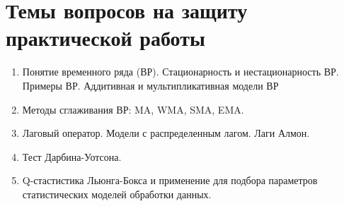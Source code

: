 \documentclass[
]{article}
\providecommand{\tightlist}{%
  \setlength{\itemsep}{0pt}\setlength{\parskip}{0pt}}
\begin{document}
\hypertarget{ux442ux435ux43cux44b-ux432ux43eux43fux440ux43eux441ux43eux432-ux43dux430-ux437ux430ux449ux438ux442ux443-ux43fux440ux430ux43aux442ux438ux447ux435ux441ux43aux43eux439-ux440ux430ux431ux43eux442ux44b}{%
\section{\texorpdfstring{\textbf{Темы вопросов на защиту практической
работы}}{Темы вопросов на защиту практической работы}}\label{ux442ux435ux43cux44b-ux432ux43eux43fux440ux43eux441ux43eux432-ux43dux430-ux437ux430ux449ux438ux442ux443-ux43fux440ux430ux43aux442ux438ux447ux435ux441ux43aux43eux439-ux440ux430ux431ux43eux442ux44b}}

\begin{enumerate}
\def\labelenumi{\arabic{enumi}.}
\tightlist
\item
  Понятие временного ряда (ВР). Стационарность и нестационарность ВР.
  Примеры ВР. Аддитивная и мультипликативная модели ВР
\item
  Методы сглаживания ВР: MA, WMA, SMA, EMA.
\item
  Лаговый оператор. Модели с распределенным лагом. Лаги Алмон.
\item
  Тест Дарбина-Уотсона.
\item
  Q-стастистика Льюнга-Бокса и применение для подбора параметров
  статистических моделей обработки данных.
\end{enumerate}
\end{document}
